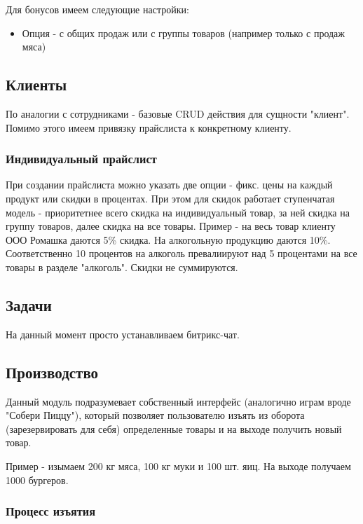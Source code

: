 \documentclass[DIV=calc, paper=a4, fontsize=11pt]{scrartcl} %
\begin{document}
Для бонусов имеем следующие настройки:

\begin{itemize}
	\item Опция - с общих продаж или с группы товаров (например только с продаж мяса)
\end{itemize}

\subsection{Клиенты}

По аналогии с сотрудниками - базовые CRUD действия для сущности "клиент". Помимо этого имеем привязку прайслиста к конкретному клиенту.

\subsubsection{Индивидуальный прайслист}
При создании прайслиста можно указать две опции - фикс. цены на каждый продукт или скидки в процентах. При этом для скидок работает ступенчатая модель - приоритетнее всего скидка на индивидуальный товар, за ней скидка на группу товаров, далее скидка на все товары.
Пример - на весь товар клиенту ООО Ромашка даются 5\% скидка. На алкогольную продукцию даются 10\%. Соответственно 10 процентов на алкоголь превалиируют над 5 процентами на все товары в разделе "алкоголь". Скидки не суммируются.

\subsection{Задачи}

На данный момент просто устанавливаем битрикс-чат.

\subsection{Производство}

Данный модуль подразумевает собственный интерфейс (аналогично играм вроде "Собери Пиццу"), который позволяет пользователю изъять из оборота (зарезервировать для себя) определенные товары и на выходе получить новый товар.

Пример - изымаем 200 кг мяса, 100 кг муки и 100 шт. яиц. На выходе получаем 1000 бургеров. 

\subsubsection{Процесс изъятия}
\end{document}
